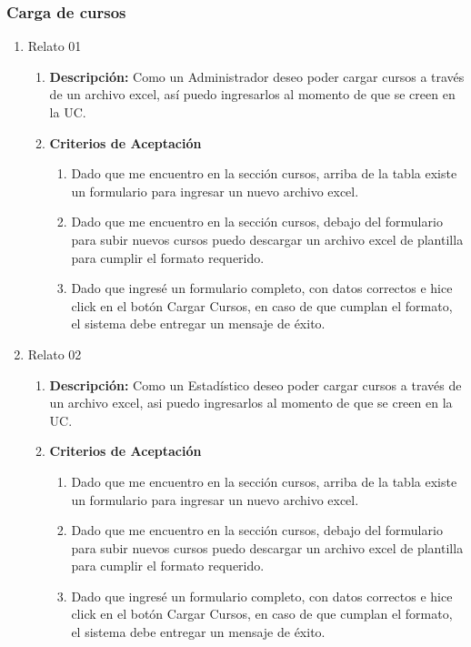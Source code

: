 \subsubsection{Carga de cursos}

\begin{enumerate}
	\item Relato 01
		\begin{enumerate}
			\item \textbf{Descripción:} Como un Administrador deseo poder cargar cursos a través de un archivo excel, así puedo ingresarlos al momento de que se creen en la UC.
			\item \textbf{Criterios de Aceptación}
				\begin{enumerate}
					\item Dado que me encuentro en la sección cursos, arriba de la tabla existe un formulario para ingresar un nuevo archivo excel.
					\item Dado que me encuentro en la sección cursos, debajo del formulario para subir nuevos cursos puedo descargar un archivo excel de plantilla para cumplir el formato requerido.
					\item Dado que ingresé un formulario completo, con datos correctos e hice click en el botón Cargar Cursos, en caso de que cumplan el formato, el sistema debe entregar un mensaje de éxito.
				\end{enumerate}
		\end{enumerate}
	\item Relato 02
		\begin{enumerate}
			\item \textbf{Descripción:} Como un Estadístico deseo poder cargar cursos a través de un archivo excel, asi puedo ingresarlos al momento de que se creen en la UC.
			\item \textbf{Criterios de Aceptación}
				\begin{enumerate}
					\item Dado que me encuentro en la sección cursos, arriba de la tabla existe un formulario para ingresar un nuevo archivo excel.
					\item Dado que me encuentro en la sección cursos, debajo del formulario para subir nuevos cursos puedo descargar un archivo excel de plantilla para cumplir el formato requerido.
					\item Dado que ingresé un formulario completo, con datos correctos e hice click en el botón Cargar Cursos, en caso de que cumplan el formato, el sistema debe entregar un mensaje de éxito.

\end{enumerate}
\end{enumerate}
\end{enumerate}

